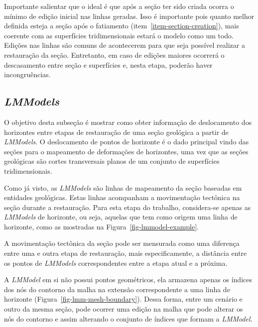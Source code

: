 Importante salientar que o ideal é que após a seção ter sido criada ocorra o mínimo de edição inicial nas linhas geradas. Isso é importante pois quanto melhor definida esteja a seção após o fatiamento (item~\ref{item-section-creation}), mais coerente com as superfícies tridimensionais estará o modelo como um todo. Edições nas linhas são comuns de acontecerem para que seja possível realizar a restauração da seção. Entretanto, em caso de edições maiores ocorrerá o descasamento entre seção e superfícies e, nesta etapa, poderão haver incongruências.

\subsection{\textit{LMModels}}\label{lmmodels-surface-map}

O objetivo desta subseção é mostrar como obter informação de deslocamento dos horizontes entre etapas de restauração de uma seção geológica a partir de \textit{LMModels}. O deslocamento de pontos de horizonte é o dado principal vindo das seções para o mapeamento de deformações de horizontes, uma vez que as seções geológicas são cortes transversais planos de um conjunto de superfícies tridimensionais.

Como já visto, as \textit{LMModels} são linhas de mapeamento da seção baseadas em entidades geológicas. Estas linhas acompanham a movimentação tectônica na seção durante a restauração. Para esta etapa do trabalho, considera-se apenas as \textit{LMModels} de horizonte, ou seja, aquelas que tem como origem uma linha de horizonte, como as mostradas na Figura~\ref{fig-lmmodel-example}.

A movimentação tectônica da seção pode ser mensurada como uma diferença entre uma e outra etapa de restauração, mais especificamente, a distância entre os pontos de \textit{LMModels} correspondentes entre a etapa atual e a próxima.

A \textit{LMModel} em si não possui pontos geométricos, ela armazena apenas os índices dos nós do contorno da malha na extensão correspondente a uma linha de horizonte (Figura~\ref{fig-lmm-mesh-boundary}). Dessa forma, entre um cenário e outro da mesma seção, pode ocorrer uma edição na malha que pode alterar os nós do contorno e assim alterando o conjunto de índices que formam a \textit{LMModel}.

